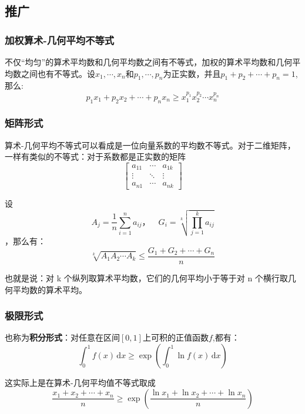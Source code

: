 \documentclass[a4paper]{article} %
\numberwithin{equation}{section} %
\newcommand{\ud}{\,\mathrm{d}}
\begin{document}
\subsection{推广}

\subsubsection{加权算术-几何平均不等式}

不仅“均匀”的算术平均数和几何平均数之间有不等式，加权的算术平均数和几何平均数之间也有不等式。设$x_1,\cdots,x_n$和$p_1,\cdots,p_n$为正实数，并且$p_1+p_2+\cdots+p_n=1$,那么:
\begin{equation*}
p_1x_1+p_2x_2+\cdots+p_nx_n\ge x_1^{p_1}x_2^{p_2}\cdots x_n^{p_n}
\end{equation*}

\subsubsection{矩阵形式}

算术-几何平均不等式可以看成是一位向量系数的平均数不等式。对于二维矩阵，一样有类似的不等式：对于系数都是正实数的矩阵
\begin{equation*}
\begin{bmatrix}
a_{11}      & \cdots & a_{1k}      \\
\vdots & \ddots & \vdots \\ 
a_{n1}      & \cdots & a_{nk}
\end{bmatrix}
\end{equation*}

设
$$
A_{j} = \frac{1}{n} \sum_{i=1}^n a_{ij}，\quad G_{i}=\sqrt[k]{\prod_{j=1}^k a_{ij}} 
$$，那么有：
$$
\sqrt[k]{A_1 A_2 \cdots A_k} \leqslant \frac{G_1 + G_2 + \cdots + G_n}{n}
$$

也就是说：对 k 个纵列取算术平均数，它们的几何平均小于等于对 n 个横行取几何平均数的算术平均。

\subsubsection{极限形式}

也称为\textbf{积分形式}：对任意在区间$[0,1]$上可积的正值函数$f$,都有：
\begin{equation}
\int_0^1 f(x)\ud x \ge \exp(\int_{0}^{1}\ln f(x)\ud x)
\end{equation}

这实际上是在算术-几何平均值不等式取成
$$ \frac {x_{1}+x_{2}+\cdots +x_{n}}{n}  \ge \exp ( \frac{\ln {x_1} + \ln {x_2} + \cdots + \ln {x_n}}{n} )
$$
\end{document}
